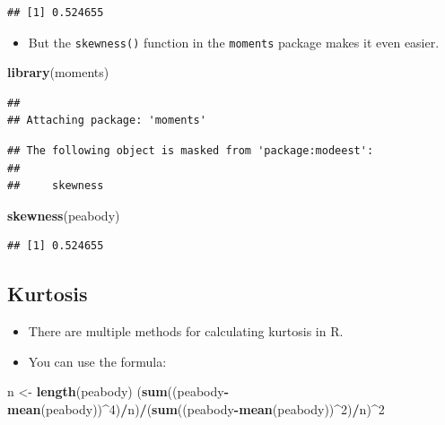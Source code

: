\documentclass[
]{book}
\newenvironment{Shaded}{\begin{snugshade}}{\end{snugshade}}
\newcommand{\DecValTok}[1]{\textcolor[rgb]{0.00,0.00,0.81}{#1}}
\newcommand{\FunctionTok}[1]{\textcolor[rgb]{0.13,0.29,0.53}{\textbf{#1}}}
\newcommand{\NormalTok}[1]{#1}
\newcommand{\OtherTok}[1]{\textcolor[rgb]{0.56,0.35,0.01}{#1}}
\newcommand{\SpecialCharTok}[1]{\textcolor[rgb]{0.81,0.36,0.00}{\textbf{#1}}}
\providecommand{\tightlist}{%
  \setlength{\itemsep}{0pt}\setlength{\parskip}{0pt}}
\begin{document}
\begin{verbatim}
## [1] 0.524655
\end{verbatim}

\begin{itemize}
\tightlist
\item
  But the \texttt{skewness()} function in the \texttt{moments} package makes it even easier.
\end{itemize}

\begin{Shaded}
\begin{Highlighting}[]
\FunctionTok{library}\NormalTok{(moments)}
\end{Highlighting}
\end{Shaded}

\begin{verbatim}
## 
## Attaching package: 'moments'
\end{verbatim}

\begin{verbatim}
## The following object is masked from 'package:modeest':
## 
##     skewness
\end{verbatim}

\begin{Shaded}
\begin{Highlighting}[]
\FunctionTok{skewness}\NormalTok{(peabody)}
\end{Highlighting}
\end{Shaded}

\begin{verbatim}
## [1] 0.524655
\end{verbatim}

\subsection{Kurtosis}\label{kurtosis}

\begin{itemize}
\item
  There are multiple methods for calculating kurtosis in R.
\item
  You can use the formula:
\end{itemize}

\begin{Shaded}
\begin{Highlighting}[]
\NormalTok{n }\OtherTok{\textless{}{-}} \FunctionTok{length}\NormalTok{(peabody)}
\NormalTok{(}\FunctionTok{sum}\NormalTok{((peabody}\SpecialCharTok{{-}}\FunctionTok{mean}\NormalTok{(peabody))}\SpecialCharTok{\^{}}\DecValTok{4}\NormalTok{)}\SpecialCharTok{/}\NormalTok{n)}\SpecialCharTok{/}\NormalTok{(}\FunctionTok{sum}\NormalTok{((peabody}\SpecialCharTok{{-}}\FunctionTok{mean}\NormalTok{(peabody))}\SpecialCharTok{\^{}}\DecValTok{2}\NormalTok{)}\SpecialCharTok{/}\NormalTok{n)}\SpecialCharTok{\^{}}\DecValTok{2}
\end{Highlighting}
\end{Shaded}
\end{document}

